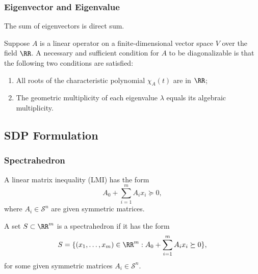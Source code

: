 \documentclass[12pt]{article}
\begin{document}
\subsubsection{Eigenvector and Eigenvalue}

\begin{Theorem}
  The sum of eigenvectors is direct sum.
\end{Theorem}

\begin{Theorem}[Diagonalizable]
  \label{thm:Diagonal}
  Suppose \( A \) is a linear operator on a finite-dimensional vector space \( V \) over the field \( \RR \).  
A necessary and sufficient condition for \( A \) to be diagonalizable is that the following two conditions are satisfied:

\begin{enumerate}
    \item All roots of the characteristic polynomial \( \chi_A(t) \) are in \( \RR \);
    \item The geometric multiplicity of each eigenvalue \( \lambda \) equals its algebraic multiplicity.
\end{enumerate}
\end{Theorem}



\subsection{SDP Formulation}
\subsubsection{Spectrahedron}

\begin{Define}[LMI]
  A linear matrix inequality (LMI) has the
  form
  \[
    A_0 + \sum_{i=1}^m A_ix_i \succeq 0,
  \]
  where $A_i \in \mathcal{S}^n$ are given
  symmetric matrices.
\end{Define}

\begin{Define}[Spectrahedron]
  A set $S \subset \RR^m$ is a spectrahedron if
  it has the form
  \[
    S = \{(x_1,\dots,x_m) \in \RR^m :
    A_0 + \sum_{i=1}^m A_ix_i \succeq 0\},
  \]
  for some given symmetric matrices $A_i \in
  \mathcal{S}^n$.
\end{Define}
\end{document}
